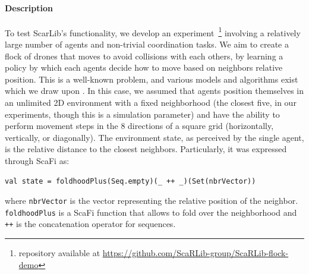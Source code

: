 \paragraph{Description}
To test ScarLib's functionality, 
 we develop an experiment~\footnote{repository available at \url{https://github.com/ScaRLib-group/ScaRLib-flock-demo}}
 involving a relatively large number of agents 
 and non-trivial coordination tasks. 
% 
We aim to create a flock of drones 
 that moves to avoid collisions with each others, by learning a policy by which each 
 agents decide how to move based on neighbors relative position.
% 
This is a well-known problem, and various models and algorithms exist which we draw upon \cite{DBLP:conf/siggraph/Reynolds87,inverserl}. %
%
In this case, %
 we assumed that agents position themselves in an unlimited 2D environment 
 with a fixed neighborhood (the closest five, in our experiments, though this is a simulation parameter)
 and have the ability to perform movement steps in the 8 directions of a square grid (horizontally, vertically, or diagonally).
%
The environment state, as perceived by the single agent, is the relative distance to the closest neighbors.
%
Particularly, it was expressed through ScaFi as:
\begin{lstlisting}
val state = foldhoodPlus(Seq.empty)(_ ++ _)(Set(nbrVector))
\end{lstlisting}
where \texttt{nbrVector} is the vector representing the relative position of the neighbor.
\lstinline|foldhoodPlus| is a ScaFi function that allows to fold over the neighborhood 
 and \lstinline|++| is the concatenation operator for sequences.

